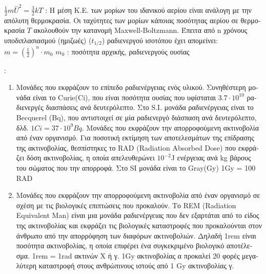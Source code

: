 \documentclass[12pt]{article}
\begin{document}
\begin{flushleft}
	\textbullet \quad $\displaystyle \frac{1}{2} m \overset{-}{U}^2 = \frac{3}{2}kT$  :  \textgreek{Η μέση Κ.Ε. των μορίων του ιδανικού αερίου είναι ανάλογη με την απόλυτη θερμοκρασία}. \linebreak 
	\textbullet \quad \textgreek{Οι ταχύτητες των μορίων κάποιας ποσότητας αερίου σε θερμοκρασία} $T$ \textgreek{ακολουθούν την κατανομή} Maxwell-Boltzmann. \linebreak 
	\textbullet \quad \textgreek{Έπειτα από} n \textgreek{χρόνους υποδιπλασιασμού (ημιζωές)} ($t_{1/2}$) \textgreek{ραδιενεργού ισοτόπου έχει απομείνει}: $\displaystyle m= (\frac{1}{2})^n \cdot m_0$ \linebreak 
	$m_0$  :  \textgreek{ποσότητα αρχικής, ραδιενεργούς ουσίας} \linebreak 
	
	: 
	\begin{enumerate}
	\item \textgreek{Μονάδες που εκφράζουν το επίπεδο ραδιενέργειας ενός υλικού}. \linebreak 
	\textgreek{Συνηθέστερη μονάδα είναι το} Curie(Ci), \textgreek{που είναι ποσότητα ουσίας που υφίσταται} $3.7 \cdot 10^{10}$ \textgreek{ραδιενεργές διασπάσεις ανά δευτερόλεπτο}. \linebreak 
	\textgreek{Στο} S.I. \textgreek{μονάδα ραδιενέργειας είναι το} Becquerel (Bq), \textgreek{που αντιστοιχεί σε μία ραδιενεργό διάσπαση ανά δευτερόλεπτο, δλδ.} $1Ci = 37\cdot 10^9 Bq$. \linebreak 
	\textgreek{Μονάδες που εκφράζουν την απορροφούμενη ακτινοβολία από έναν οργανισμό}. \linebreak 
	\textgreek{Για ποσοτική εκτίμηση των αποτελεσμάτων της επίδρασης της ακτινοβολίας, θεσπίστηκες το} RAD (Radiation Absorbed Dose) \textgreek{που εκφράζει δόση ακτινοβολίας, η οποία απελευθερώνει} $10^{-2}$J \textgreek{ενέργειας ανά} kg \textgreek{βάρους του σώματος που την απορροφά. Στο} SI \textgreek{μονάδα είναι το} Gray(Gy) \linebreak 
	1Gy = 100 RAD 
	\item \textgreek{Μονάδες που εκφράζουν την απορροφούμενη ακτινοβολία από έναν οργανισμό σε σχέση με τις βιολογικές επιπτώσεις που προκαλούν}. \linebreak 
	\textgreek{Το} REM (Radiation Equivalent Man) \textgreek{είναι μια μονάδα ραδιενέργειας που δεν εξαρτάται από το είδος της ακτινοβολίας και εκφράζει τις βιολογικές καταστροφές που προκαλούνται στον άνθρωπο από την απορρόφηση των διαφόρων ακτινοβολιών. Δηλαδή} 1rem \textgreek{είναι ποσότητα ακτινοβολίας, η οποία επιφέρει ένα συγκεκριμένο βιολογικό αποτέλεσμα.} \linebreak 
	1rem = 1rad \textgreek{ακτινών Χ ή γ. 1}Gy \textgreek{ακτινοβολίας α προκαλεί 20 φορές μεγαλύτερη καταστροφή στους ανθρώπινους ιστούς από 1} Gy \textgreek{ακτινοβολίας γ}.
	\end{enumerate}
	

\end{flushleft}
\end{document}
